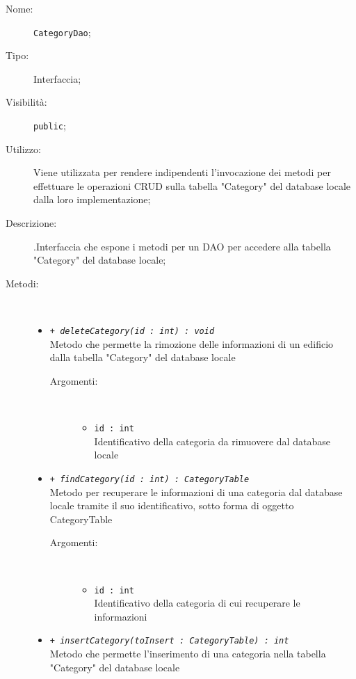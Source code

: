 \documentclass[../DefinizioneDiProdotto.tex]{subfiles}
\begin{document}
\begin{description}
	\item[Nome:] \texttt{CategoryDao};
	\item[Tipo:] Interfaccia;
	\item[Visibilità:] \texttt{public};
	\item[Utilizzo:] Viene utilizzata per rendere indipendenti l'invocazione dei metodi per effettuare le operazioni CRUD sulla tabella "Category" del database locale dalla loro implementazione;
	\item[Descrizione:] .Interfaccia che espone i metodi per un DAO per accedere alla tabella "Category" del database locale;
	\item[Metodi:] \
	\begin{itemize}
		\item \texttt{+ \textit{deleteCategory(id : int) : void}}\\
		Metodo che permette la rimozione delle informazioni di un edificio dalla tabella "Category" del database locale
		\begin{description}
			\item[Argomenti:] \
			\begin{itemize}
				\item \texttt{id : int}\\
				Identificativo della categoria da rimuovere dal database locale\end{itemize}
		\end{description}
		\item \texttt{+ \textit{findCategory(id : int) : CategoryTable}}\\
		Metodo per recuperare le informazioni di una categoria dal database locale tramite il suo identificativo, sotto forma di oggetto CategoryTable
		\begin{description}
			\item[Argomenti:] \
			\begin{itemize}
				\item \texttt{id : int}\\
				Identificativo della categoria di cui recuperare le informazioni\end{itemize}
		\end{description}
		\item \texttt{+ \textit{insertCategory(toInsert : CategoryTable) : int}}\\
		Metodo che permette l'inserimento di una categoria nella tabella "Category" del database locale
		\begin{description}

\end{description}
\end{itemize}
\end{description}
\end{document}
